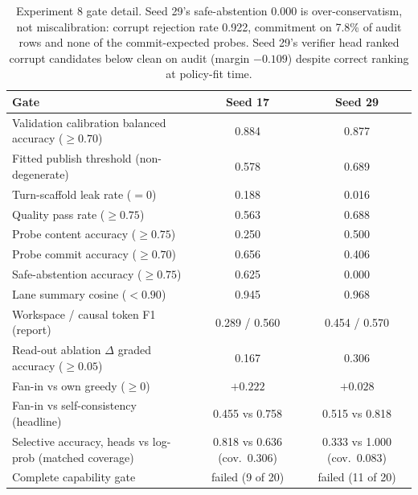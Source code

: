 \documentclass[10pt,a4paper]{article}
\newcommand{\fail}[1]{\textcolor{failred}{#1}}
\newcommand{\good}[1]{\textcolor{okgreen}{#1}}
\begin{document}
\begin{table}[htbp]
\caption{Experiment 8 gate detail. Seed 29's safe-abstention 0.000 is over-conservatism, not miscalibration: corrupt rejection rate 0.922, commitment on 7.8\% of audit rows and none of the commit-expected probes. Seed 29's verifier head ranked corrupt candidates below clean on audit (margin $-0.109$) despite correct ranking at policy-fit time.}
\label{tab:app-exp8-gates}
\centering\footnotesize
\begin{tabularx}{\textwidth}{@{}Xcc@{}}
\toprule
Gate & Seed 17 & Seed 29 \\
\midrule
Validation calibration balanced accuracy ($\geq 0.70$) & 0.884 & 0.877 \\
Fitted publish threshold (non-degenerate) & \good{0.578} & \good{0.689} \\
Turn-scaffold leak rate ($= 0$) & \fail{0.188} & \fail{0.016} \\
Quality pass rate ($\geq 0.75$) & \fail{0.563} & \fail{0.688} \\
Probe content accuracy ($\geq 0.75$) & \fail{0.250} & \fail{0.500} \\
Probe commit accuracy ($\geq 0.70$) & \fail{0.656} & \fail{0.406} \\
Safe-abstention accuracy ($\geq 0.75$) & \fail{0.625} & \fail{0.000} \\
Lane summary cosine ($< 0.90$) & \fail{0.945} & \fail{0.968} \\
Workspace / causal token F1 (report) & 0.289 / 0.560 & 0.454 / 0.570 \\
Read-out ablation $\Delta$ graded accuracy ($\geq 0.05$) & 0.167 & 0.306 \\
Fan-in vs own greedy ($\geq 0$) & $+0.222$ & $+0.028$ \\
Fan-in vs self-consistency (headline) & \fail{0.455 vs 0.758} & \fail{0.515 vs 0.818} \\
Selective accuracy, heads vs log-prob (matched coverage) & 0.818 vs 0.636 (cov.\ 0.306) & \fail{0.333 vs 1.000} (cov.\ 0.083) \\
Complete capability gate & \fail{failed (9 of 20)} & \fail{failed (11 of 20)} \\
\bottomrule
\end{tabularx}
\end{table}
\end{document}

